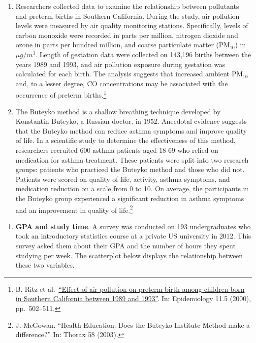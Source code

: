 \documentclass[
  letterpaper,
  DIV=11,
  numbers=noendperiod]{scrreprt}
\providecommand{\tightlist}{%
  \setlength{\itemsep}{0pt}\setlength{\parskip}{0pt}}\usepackage{longtable,booktabs,array}
\begin{document}
\begin{enumerate}
\def\labelenumi{\alph{enumi}.}
\item
  Researchers collected data to examine the relationship between
  pollutants and preterm births in Southern California. During the
  study, air pollution levels were measured by air quality monitoring
  stations. Specifically, levels of carbon monoxide were recorded in
  parts per million, nitrogen dioxide and ozone in parts per hundred
  million, and coarse particulate matter (PM\(_{10}\)) in \(\mu g/m^3\).
  Length of gestation data were collected on 143,196 births between the
  years 1989 and 1993, and air pollution exposure during gestation was
  calculated for each birth. The analysis suggests that increased
  ambient PM\(_{10}\) and, to a lesser degree, CO concentrations may be
  associated with the occurrence of preterm births.\footnote{B. Ritz et
    al.~\href{http://journals.lww.com/epidem/Abstract/2000/09000/Effect_of_Air_Pollution_on_Preterm_Birth_Among.4.aspx}{``Effect
    of air pollution on preterm birth among children born in Southern
    California between 1989 and 1993''}. In: Epidemiology 11.5 (2000),
    pp.~502--511.}
\item
  The Buteyko method is a shallow breathing technique developed by
  Konstantin Buteyko, a Russian doctor, in 1952. Anecdotal evidence
  suggests that the Buteyko method can reduce asthma symptoms and
  improve quality of life. In a scientific study to determine the
  effectiveness of this method, researchers recruited 600 asthma
  patients aged 18-69 who relied on medication for asthma treatment.
  These patients were split into two research groups: patients who
  practiced the Buteyko method and those who did not. Patients were
  scored on quality of life, activity, asthma symptoms, and medication
  reduction on a scale from 0 to 10. On average, the participants in the
  Buteyko group experienced a significant reduction in asthma symptoms
  and an improvement in quality of life.\footnote{J. McGowan. ``Health
    Education: Does the Buteyko Institute Method make a difference?''
    In: Thorax 58 (2003).}
\end{enumerate}

\begin{enumerate}
\def\labelenumi{\arabic{enumi}.}
\setcounter{enumi}{1}
\tightlist
\item
  \textbf{GPA and study time}. A survey was conducted on 193
  undergraduates who took an introductory statistics course at a private
  US university in 2012. This survey asked them about their GPA and the
  number of hours they spent studying per week. The scatterplot below
  displays the relationship between these two variables.
\end{enumerate}
\end{document}

